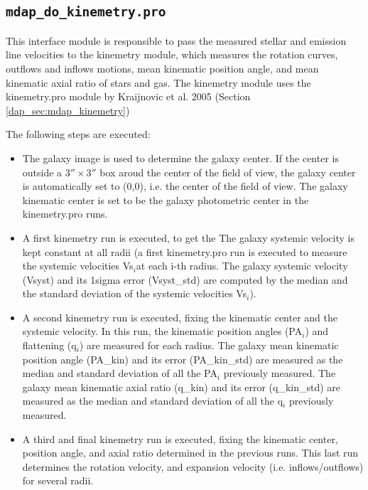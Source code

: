 \subsection{{\tt mdap\_do\_kinemetry.pro}}
\label{dap_sec:mdap_do_kinemetry}

This interface module is responsible to pass the measured stellar and
emission line velocities to the kinemetry module, which measures the
rotation curves, outflows and inflows motions, mean kinematic position
angle, and mean kinematic axial ratio of stars and gas. The kinemetry
module uses the kinemetry.pro module by Kraijnovic et al. 2005
(Section \ref{dap_sec:mdap_kinemetry})

The following steps are executed:

 \begin{itemize}

  \item The galaxy image is used to determine the galaxy center. If
    the center is outside a $3''\times 3''$ box aroud the center of
    the field of view, the galaxy center is automatically set to
    (0,0), i.e. the center of the field of view. The galaxy kinematic
    center is set to be the galaxy photometric center in the
    kinemetry.pro runs.


 \item A first kinemetry run is executed, to get the The galaxy
   systemic velocity is kept constant at all radii (a first
   kinemetry.pro run is executed to measure the systemic velocities
   Vs$_i$at each i-th radius. The galaxy systemic velocity (Vsyst) and
   its 1sigma error (Vsyst\_std) are computed by the median and the
   standard deviation of the systemic velocities Vs$_i$).

 \item A second kinemetry run is executed, fixing the kinematic center
   and the systemic velocity. In this run, the kinematic position
   angles (PA$_i$) and flattening (q$_i$) are measured for each
   radius. The galaxy mean kinematic position angle (PA\_kin) and its
   error (PA\_kin\_std) are measured as the median and standard
   deviation of all the PA$_i$ previously measured.  The galaxy mean
   kinematic axial ratio (q\_kin) and its error (q\_kin\_std) are
   measured as the median and standard deviation of all the q$_i$
   previously measured.

\item A third and final kinemetry run is executed, fixing the
  kinematic center, position angle, and axial ratio determined in the
  previous runs. This last run determines the rotation velocity, and
  expansion velocity (i.e. inflows/outflows) for several radii.

\end{itemize}


